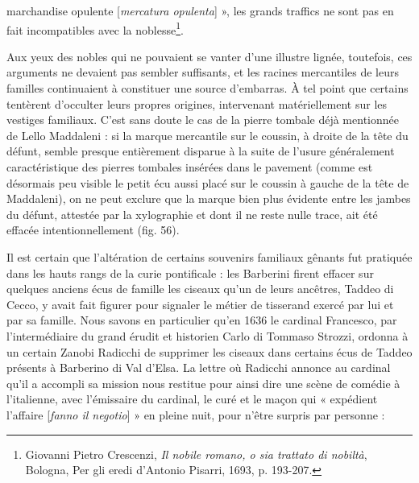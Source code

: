 \documentclass[12pt,twoside,openany]{book}
\begin{document}
marchandise opulente [\textit{mercatura opulenta}] », les grands traffics ne sont pas en fait incompatibles avec la noblesse\footnote{Giovanni Pietro Crescenzi, \textit{Il nobile romano, o sia trattato di nobiltà}, Bologna, Per gli eredi d’Antonio Pisarri, 1693, p. 193-207.}.

Aux yeux des nobles qui ne pouvaient se vanter d’une illustre lignée, toutefois, ces arguments ne devaient pas sembler suffisants, et les racines mercantiles de leurs familles continuaient à constituer une source d’embarras. À tel point que certains tentèrent d’occulter leurs propres origines, intervenant matériellement sur les vestiges familiaux. C’est sans doute le cas de la pierre tombale déjà mentionnée de Lello Maddaleni : si la marque mercantile sur le coussin, à droite de la tête du défunt, semble presque entièrement disparue à la suite de l’usure généralement caractéristique des pierres tombales insérées dans le pavement (comme est désormais peu visible le petit écu aussi placé sur le coussin à gauche de la tête de Maddaleni), on ne peut exclure que la marque bien plus évidente entre les jambes du défunt, attestée par la xylographie et dont il ne reste nulle trace, ait été effacée intentionnellement (fig. 56).

Il est certain que l’altération de certains souvenirs familiaux gênants fut pratiquée dans les hauts rangs de la curie pontificale : les Barberini firent effacer sur quelques anciens écus de famille les ciseaux qu’un de leurs ancêtres, Taddeo di Cecco, y avait fait figurer pour signaler le métier de tisserand exercé par lui et par sa famille. Nous savons en particulier qu’en 1636 le cardinal Francesco, par l’intermédiaire du grand érudit et historien Carlo di Tommaso Strozzi, ordonna à un certain Zanobi Radicchi de supprimer les ciseaux dans certains écus de Taddeo présents à Barberino di Val d’Elsa. La lettre où Radicchi annonce au cardinal qu’il a accompli sa mission nous restitue pour ainsi dire une scène de comédie à l’italienne, avec l’émissaire du cardinal, le curé et le maçon qui « expédient l’affaire [\textit{fanno il negotio}] » en pleine nuit, pour n’être surpris par personne :
\end{document}
